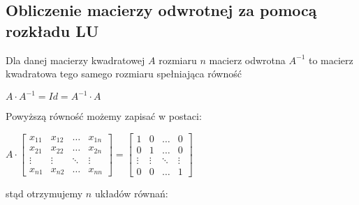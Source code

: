 \documentclass[11pt]{article}
\begin{document}
\subsection{Obliczenie macierzy odwrotnej za pomocą rozkładu LU}
Dla danej macierzy kwadratowej $A$ rozmiaru $n$ macierz odwrotna $A^{-1}$ to macierz kwadratowa tego samego rozmiaru spełniająca równość
\begin{center}
$A \cdot A^{-1} = Id = A^{-1} \cdot A$
\end{center}
Powyższą równość możemy zapisać w postaci:
\begin{center}
\begin{math}
A \cdot 
\begin{bmatrix}
    x_{11} & x_{12} & \dots  & x_{1n} \\
    x_{21} & x_{22} & \dots  & x_{2n} \\
    \vdots & \vdots & \ddots & \vdots \\
    x_{n1} & x_{n2} & \dots  & x_{nn}
\end{bmatrix}
=
\begin{bmatrix}
    1 & 0 & \dots  & 0 \\
    0 & 1 & \dots  & 0 \\
    \vdots & \vdots & \ddots & \vdots \\
    0 & 0 & \dots  & 1
\end{bmatrix}
\end{math}
\end{center}
stąd otrzymujemy $n$ układów równań:
\end{document}
